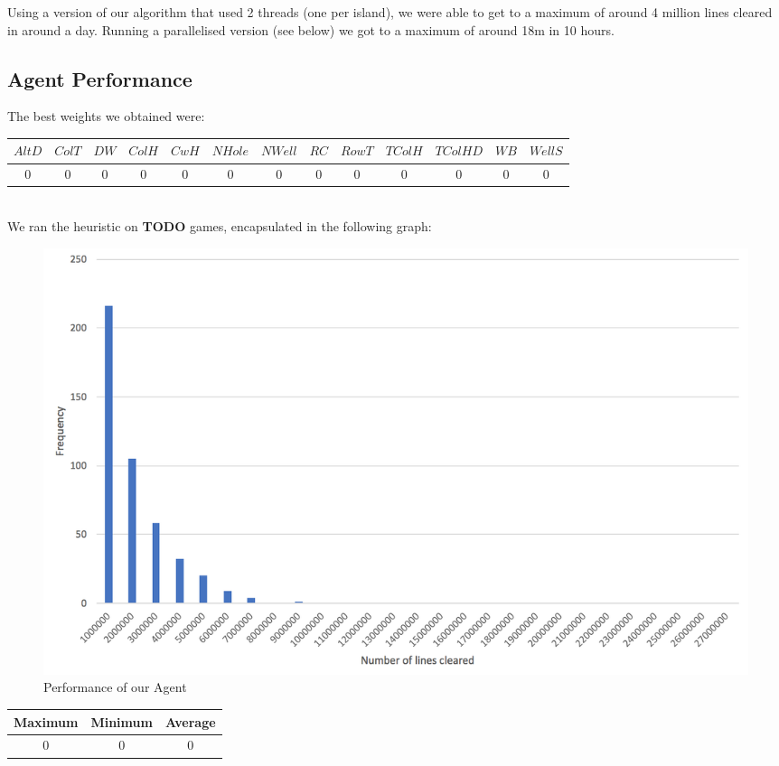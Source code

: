 \documentclass{article}
\begin{document}
	Using a version of our algorithm that used 2 threads (one per island),
	we were able to get to a maximum of around 4 million lines cleared in
	around a day. Running a parallelised version (see below) we got to a maximum of
	around 18m in 10 hours.\\

	\subsection{Agent Performance}
	The best weights we obtained were:\\

	\begin{tabular}{ | c | c | c | c | c | c | c | c | c | c | c | c | c | }
		\hline
		$AltD$ & $ColT$ & $DW$ & $ColH$ & $CwH$ & $NHole$ & $NWell$ & $RC$ & $RowT$ & $TColH$ & $TColHD$ & $WB$ & $WellS$ \\ \hline
		0 & 0 & 0 & 0 & 0 & 0 & 0 & 0 & 0 & 0 & 0 & 0 & 0 \\ \hline
	\end{tabular}\\[0.25em]

	We ran the heuristic on \textbf{TODO} games, encapsulated in the following graph:\\

	\begin{figure}[h]
		\includegraphics[scale=0.4]{heuristic/heuristic}
		\centering
		\caption{Performance of our Agent}
		\label{fig:agent}
	\end{figure}

	\vspace{-4mm}
	\begin{center}
		\begin{tabular}{ | c | c | c | }
			\hline
			Maximum & Minimum & Average \\ \hline
			0 & 0 & 0 \\ \hline
		\end{tabular}\\
	\end{center}
\end{document}
